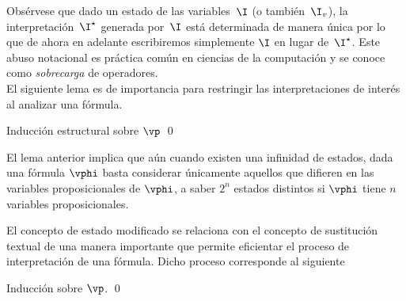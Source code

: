 \documentclass[11pt,letterpaper]{article}
\begin{document}
Obs\'ervese que dado un estado de las variables~$\I$ (o tambi\'en~$\I_v$), la 
interpretaci\'on~$\I^\star$ generada por~$\I$ est\'a determinada de manera 
\'unica por lo que de ahora en adelante escribiremos simplemente $\I$ en lugar 
de~$\I^\star$. Este abuso notacional es pr\'actica com\'un en ciencias de la
computaci\'on y se conoce como \textit{sobrecarga} de operadores. \\

\noindent El siguiente lema es de importancia para restringir las 
interpretaciones de inter\'es al analizar una f\'ormula.

\proof
Inducci\'on estructural sobre $\vp$
\qed

\espc

El lema anterior implica que a\'un cuando existen una infinidad de estados, dada 
una f\'ormula $\vphi$ basta considerar \'unicamente aquellos que difieren en 
las variables proposicionales de $\vphi$, a saber $2^n$ estados distintos si 
$\vphi$ tiene $n$ variables proposicionales.



El concepto de estado modificado se relaciona con el concepto de sustituci\'on 
textual de una manera importante que permite eficientar el proceso de 
interpretaci\'on de una f\'ormula. Dicho proceso corresponde al siguiente

\proof Inducci\'on sobre $\vp$. %
\qed
\end{document}
